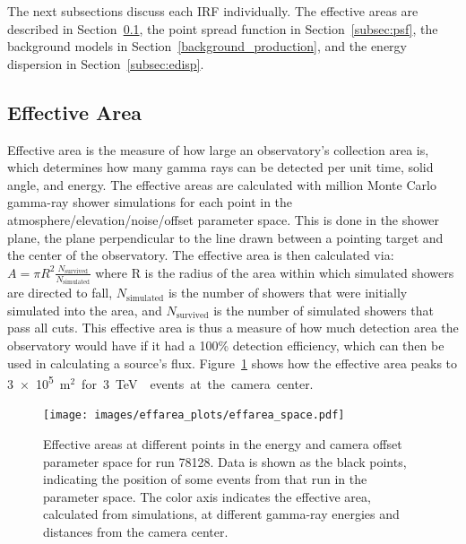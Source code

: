The next subsections discuss each IRF individually.
The effective areas are described in Section~\ref{subsec:effarea}, the point spread function in Section~\ref{subsec:psf}, the background models in Section~\ref{background_production}, and the energy dispersion in Section~\ref{subsec:edisp}.

\FloatBarrier
  
\subsection{Effective Area}\label{subsec:effarea}
Effective area is the measure of how large an observatory's collection area is, which determines how many gamma rays can be detected per unit time, solid angle, and energy.
The effective areas are calculated with  million Monte Carlo gamma-ray shower simulations for each point in the atmosphere/elevation/noise/offset parameter space.
This is done in the shower plane, the plane perpendicular to the line drawn between a pointing target and the center of the observatory.
The effective area is then calculated via:
$A=\pi R^2 \frac{N_{\text{survived}}}{N_{\text{simulated}}}$
where R is the radius of the area within which simulated showers are directed to fall, $N_{\text{simulated}}$ is the number of showers that were initially simulated into the area, and $N_{\text{survived}}$ is the number of simulated showers that pass all cuts.
This effective area is thus a measure of how much detection area the observatory would have if it had a 100\% detection efficiency, which can then be used in calculating a source's flux.
Figure~\ref{fig:effarea_paramspace} shows how the effective area peaks to \nicetilde{}\SI{3e5}{m${}^2$} for \SI{3}{\TeV{}} events at the camera center.

\begin{figure}[!t]
  \centering
  \texttt{[image: images/effarea\_plots/effarea\_space.pdf]}
  \caption[Effective Area Parameter Space]{
    Effective areas at different points in the energy and camera offset parameter space for run 78128.
    Data is shown as the black points, indicating the position of some events from that run in the parameter space.
    The color axis indicates the effective area, calculated from simulations, at different gamma-ray energies and distances from the camera center.
  }
  \label{fig:effarea_paramspace}
\end{figure}

